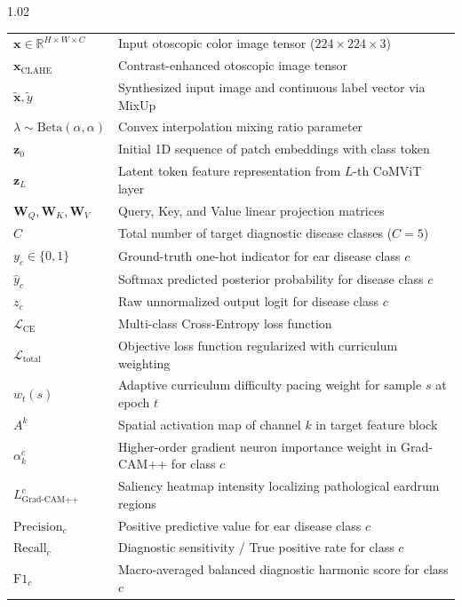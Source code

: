 \begin{spacing}{1.02}
\noindent\begin{tabular*}{\textwidth}{@{\extracolsep{\fill}}p{2.8cm} p{11.2cm}@{}}
$\mathbf{x} \in \mathbb{R}^{H \times W \times C}$ & Input otoscopic color image tensor ($224 \times 224 \times 3$) \\
$\mathbf{x}_{\text{CLAHE}}$ & Contrast-enhanced otoscopic image tensor \\
$\tilde{\mathbf{x}}, \tilde{y}$ & Synthesized input image and continuous label vector via MixUp \\
$\lambda \sim \text{Beta}(\alpha, \alpha)$ & Convex interpolation mixing ratio parameter \\
$\mathbf{z}_0$ & Initial 1D sequence of patch embeddings with class token \\
$\mathbf{z}_L$ & Latent token feature representation from $L$-th CoMViT layer \\
$\mathbf{W}_Q, \mathbf{W}_K, \mathbf{W}_V$ & Query, Key, and Value linear projection matrices \\
$C$ & Total number of target diagnostic disease classes ($C=5$) \\
$y_c \in \{0, 1\}$ & Ground-truth one-hot indicator for ear disease class $c$ \\
$\hat{y}_c$ & Softmax predicted posterior probability for disease class $c$ \\
$z_c$ & Raw unnormalized output logit for disease class $c$ \\
$\mathcal{L}_{\text{CE}}$ & Multi-class Cross-Entropy loss function \\
$\mathcal{L}_{\text{total}}$ & Objective loss function regularized with curriculum weighting \\
$w_t(s)$ & Adaptive curriculum difficulty pacing weight for sample $s$ at epoch $t$ \\
$A^k$ & Spatial activation map of channel $k$ in target feature block \\
$\alpha_k^c$ & Higher-order gradient neuron importance weight in Grad-CAM++ for class $c$ \\
$L_{\text{Grad-CAM++}}^c$ & Saliency heatmap intensity localizing pathological eardrum regions \\
$\text{Precision}_c$ & Positive predictive value for ear disease class $c$ \\
$\text{Recall}_c$ & Diagnostic sensitivity / True positive rate for class $c$ \\
$\text{F1}_c$ & Macro-averaged balanced diagnostic harmonic score for class $c$ \\
\end{tabular*}
\end{spacing}

\thispagestyle{plain}
